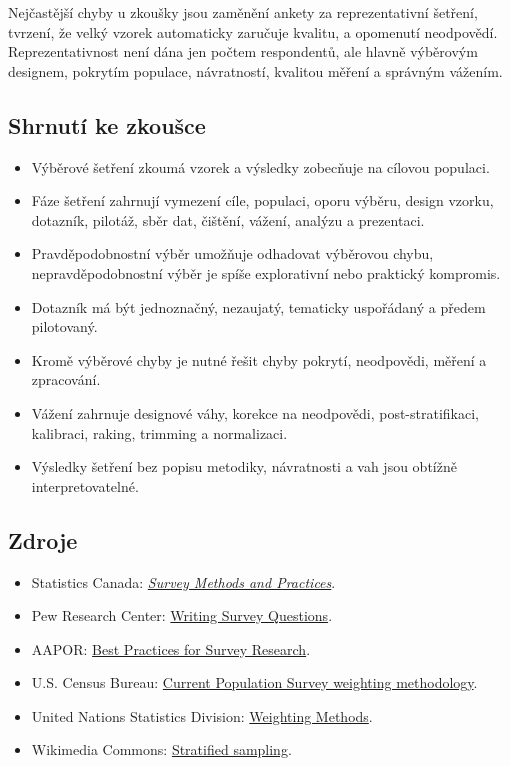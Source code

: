 \pozor
Nejčastější chyby u zkoušky jsou zaměnění ankety za reprezentativní šetření, tvrzení, že velký
vzorek automaticky zaručuje kvalitu, a opomenutí neodpovědí. Reprezentativnost není dána jen počtem
respondentů, ale hlavně výběrovým designem, pokrytím populace, návratností, kvalitou měření a
správným vážením.

\subsection{Shrnutí ke zkoušce}
\begin{itemize}
  \item Výběrové šetření zkoumá vzorek a výsledky zobecňuje na cílovou populaci.
  \item Fáze šetření zahrnují vymezení cíle, populaci, oporu výběru, design vzorku, dotazník,
  pilotáž, sběr dat, čištění, vážení, analýzu a prezentaci.
  \item Pravděpodobnostní výběr umožňuje odhadovat výběrovou chybu, nepravděpodobnostní výběr je
  spíše explorativní nebo praktický kompromis.
  \item Dotazník má být jednoznačný, nezaujatý, tematicky uspořádaný a předem pilotovaný.
  \item Kromě výběrové chyby je nutné řešit chyby pokrytí, neodpovědi, měření a zpracování.
  \item Vážení zahrnuje designové váhy, korekce na neodpovědi, post-stratifikaci, kalibraci, raking,
  trimming a normalizaci.
  \item Výsledky šetření bez popisu metodiky, návratnosti a vah jsou obtížně interpretovatelné.
\end{itemize}

\subsection{Zdroje}
\begin{itemize}
  \item Statistics Canada: \href{https://www150.statcan.gc.ca/n1/en/pub/12-587-x/12-587-x2003001-eng.pdf}{\textit{Survey Methods and Practices}}.
  \item Pew Research Center: \href{https://www.pewresearch.org/our-methods/u-s-surveys/writing-survey-questions/}{Writing Survey Questions}.
  \item AAPOR: \href{https://aapor.org/standards-and-ethics/best-practices/}{Best Practices for Survey Research}.
  \item U.S. Census Bureau: \href{https://www.census.gov/programs-surveys/cps/technical-documentation/methodology/weighting.html}{Current Population Survey weighting methodology}.
  \item United Nations Statistics Division: \href{https://unstats.un.org/unsd/demographic-social/meetings/2024/webinar-WGESA-30Oct-01Nov/Weighting_Methods-Global_Calendar.pdf}{Weighting Methods}.
  \item Wikimedia Commons: \href{https://commons.wikimedia.org/wiki/File:Stratified_sampling.PNG}{Stratified sampling}.
\end{itemize}

\newpage
